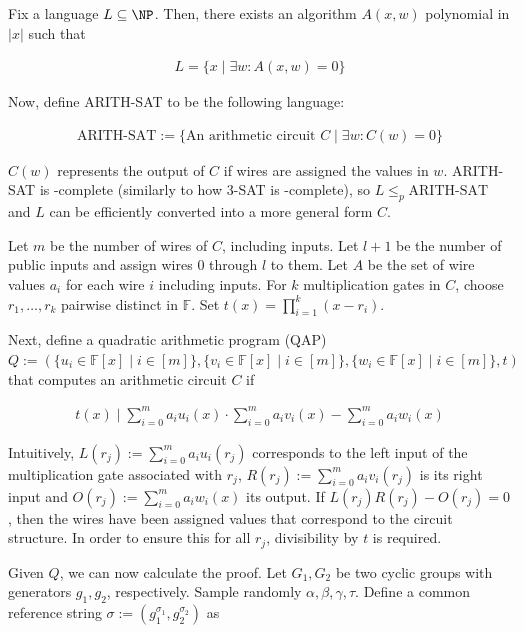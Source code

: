\documentclass{article}
\begin{document}
Fix a language $L \subseteq \NP$.
Then, there exists an algorithm $A(x, w)$ polynomial in $|x|$ such that

\begin{align*} L = \{ x \mid \exists w\colon A(x, w) = 0\} \end{align*}

Now, define ARITH-SAT to be the following language:

\begin{align*} \text{ARITH-SAT} := \{ \text{An arithmetic circuit } C \mid \exists w\colon C(w) = 0\} \end{align*}

$C(w)$ represents the output of $C$ if wires are assigned the values in $w$.
ARITH-SAT is \NP-complete (similarly to how 3-SAT is \NP-complete), so $L \leq_p \text{ARITH-SAT}$ and $L$ can be efficiently converted into a more general form $C$.

Let $m$ be the number of wires of $C$, including inputs.
Let $l+1$ be the number of public inputs and assign wires $0$ through $l$ to them.
Let $A$ be the set of wire values $a_i$ for each wire $i$ including inputs.
For $k$ multiplication gates in $C$, choose $r_1, \ldots, r_k$ pairwise distinct in $\mathbb{F}$.
Set $t(x) = \prod_{i=1}^k(x-r_i)$.


Next, define a quadratic arithmetic program (QAP) $Q := (\{u_i \in \mathbb{F}[x] \mid i \in [m]\}, \{v_i \in \mathbb{F}[x] \mid i \in [m]\}, \{w_i \in \mathbb{F}[x] \mid i \in [m]\}, t)$ that computes an arithmetic circuit $C$ if

\begin{align*}
        t(x) \mid \sum_{i=0}^m a_iu_i(x) \cdot \sum_{i=0}^m a_iv_i(x) - \sum_{i=0}^{m} a_iw_i(x)
\end{align*}

Intuitively, $L(r_j) := \sum_{i=0}^m a_iu_i(r_j)$ corresponds to the left input of the multiplication gate associated with $r_j$,
$R(r_j) := \sum_{i=0}^m a_iv_i(r_j)$ is its right input and $O(r_j) := \sum_{i=0}^{m} a_iw_i(x)$ its output.
If $L(r_j)R(r_j) - O(r_j) = 0$, then the wires have been assigned values that correspond to the circuit structure.
In order to ensure this for all $r_j$, divisibility by $t$ is required.


Given $Q$, we can now calculate the proof. Let $G_1, G_2$ be two cyclic groups with generators $g_1, g_2$, respectively.
Sample randomly $\alpha, \beta, \gamma, \tau$. Define a common reference string $\sigma := (g_1^{\sigma_1}, g_2^{\sigma_2})$ as
\end{document}
